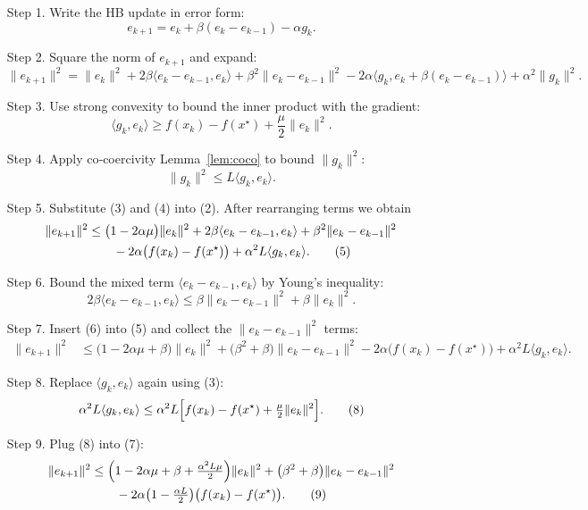 \documentclass{article}
\begin{document}
\begin{enumerate}
\item[Step 1.]  Write the HB update in error form:
\[
e_{k+1}=e_k+\beta(e_k-e_{k-1})-\alpha g_k.
\tag{1}
\]

\item[Step 2.]  Square the norm of $e_{k+1}$ and expand:
\[
\|e_{k+1}\|^2
= \|e_k\|^2+2\beta\langle e_k-e_{k-1},e_k\rangle
+\beta^2\|e_k-e_{k-1}\|^2
-2\alpha\langle g_k,e_k+\beta(e_k-e_{k-1})\rangle
+\alpha^2\|g_k\|^2 .
\tag{2}
\]

\item[Step 3.]  Use strong convexity to bound the inner product with the gradient:
\[
\langle g_k,e_k\rangle
\ge f(x_k)-f(x^\star)+\frac{\mu}{2}\|e_k\|^2 .
\tag{3}
\]

\item[Step 4.]  Apply co‑coercivity Lemma~\ref{lem:coco} to bound $\|g_k\|^2$:
\[
\|g_k\|^2\le L\langle g_k,e_k\rangle .
\tag{4}
\]

\item[Step 5.]  Substitute (3) and (4) into (2). After rearranging terms we obtain
\begin{align}
\|e_{k+1}\|^2
&\le \bigl(1-2\alpha\mu\bigr)\|e_k\|^2
+2\beta\langle e_k-e_{k-1},e_k\rangle
+\beta^2\|e_k-e_{k-1}\|^2
\notag\\
&\qquad
-2\alpha\bigl(f(x_k)-f(x^\star)\bigr)
+\alpha^2 L\langle g_k,e_k\rangle .
\tag{5}
\end{align}

\item[Step 6.]  Bound the mixed term $\langle e_k-e_{k-1},e_k\rangle$ by Young’s inequality:
\[
2\beta\langle e_k-e_{k-1},e_k\rangle
\le \beta\|e_k-e_{k-1}\|^2+\beta\|e_k\|^2 .
\tag{6}
\]

\item[Step 7.]  Insert (6) into (5) and collect the $\|e_k-e_{k-1}\|^2$ terms:
\begin{align}
\|e_{k+1}\|^2
&\le \bigl(1-2\alpha\mu+\beta\bigr)\|e_k\|^2
+\bigl(\beta^2+\beta\bigr)\|e_k-e_{k-1}\|^2
-2\alpha\bigl(f(x_k)-f(x^\star)\bigr)
+\alpha^2L\langle g_k,e_k\rangle .
\tag{7}
\end{align}

\item[Step 8.]  Replace $\langle g_k,e_k\rangle$ again using (3):
\[
\alpha^2L\langle g_k,e_k\rangle
\le \alpha^2L\Bigl[f(x_k)-f(x^\star)+\tfrac{\mu}{2}\|e_k\|^2\Bigr].
\tag{8}
\]

\item[Step 9.]  Plug (8) into (7):
\begin{align}
\|e_{k+1}\|^2
&\le \Bigl(1-2\alpha\mu+\beta+\tfrac{\alpha^2L\mu}{2}\Bigr)\|e_k\|^2
+\bigl(\beta^2+\beta\bigr)\|e_k-e_{k-1}\|^2
\notag\\
&\qquad
-2\alpha\bigl(1-\tfrac{\alpha L}{2}\bigr)\bigl(f(x_k)-f(x^\star)\bigr).
\tag{9}
\end{align}


\end{enumerate}
\end{document}
